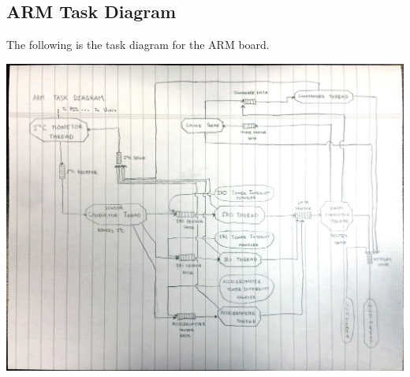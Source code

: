








\subsection*{ARM Task Diagram}
The following is the task diagram for the ARM board.
\begin{center}
	\includegraphics[scale=0.5]{Images/ARMTaskDiagram}
\end{center}

